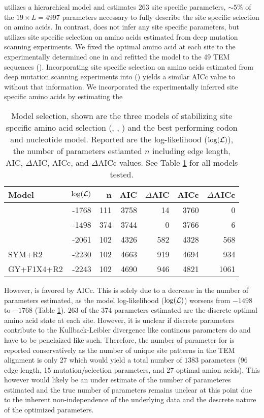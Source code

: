 \selac utilizes a hierarchical model and estimates 263 site specific parameters, $\sim5\%$ of the $19\times L = 4997$ parameters necessary to fully describe the site specific selection on amino acids.
In contrast, \phydms does not infer any site specific parameters, but utilizes site specific selection on amino acids estimated from deep mutation scanning experiments.
We fixed the optimal amino acid at each site to the experimentally determined one in \selac and refitted the model to the 49 TEM sequences (\selacDMS).
Incorporating site specific selection on amino acids estimated from deep mutation scanning experiments into \selac (\selacDMS) yields a similar AICc value to \selac without that information.
We incorporated the experimentally inferred site specific amino acids by estimating the 

\begin{table}
  \centering
  \begin{tabular}{lrrrrrr}
    Model		& $\log(\mathcal{L})$ & n & AIC & $\Delta$AIC & AICc & $\Delta$AICc\\ \hline 
    \selacDMS 		& -1768 & 111& 3758& 14	& 3760  & 0\\
    \selac		& -1498 & 374& 3744&  0	& 3766  & 6 \\
    \phydms 		& -2061 & 102& 4326& 582& 4328 & 568\\
    SYM+R2 		& -2230 & 102& 4663& 919& 4694 & 934 \\
    GY+F1X4+R2 		& -2243 & 102& 4690& 946& 4821 & 1061 \\
  \end{tabular}
  \caption{Model selection, shown are the three models of stabilizing site specific amino acid selection (\selac, \selacDMS, \phydms) and the best performing codon and nucleotide model. 
  Reported are the log-likelihood ($\log(\mathcal{L})$), the number of parameters estiamted $n$ including edge length, AIC, $\Delta$AIC, AICc, and $\Delta$AICc values.
  See Table \ref{tab:AIC} for all models tested.}
  \label{tab:AIC}
\end{table}

However, \selacDMS is favored by AICc.
This is solely due to a decrease in the number of parameters estimated, as the model log-likelihood ($\log(\mathcal{L})$) worsens from $-1498$ to $-1768$ (Table \ref{tab:AIC}).
$263$ of the $374$ parameters estimated are the discrete optimal amino acid state at each site. 
However, it is unclear if discrete parameters contribute to the Kullback-Leibler divergence like continous parameters do and have to be penelaized like such.
Therefore, the number of parameter for \selac is reported conservatively as the number of unique site patterns in the TEM alignment is only 27 which would yield a total number of $1383$ parameters (96 edge length, 15 mutation/selection parameters, and 27 optimal amion acids).
This however would likely be an under estimate of the number of parameteres estimated and the true number of parameters remains unclear at this point due to the inherent non-independence of the underlying data and the descrete nature of the optimized parameters.


